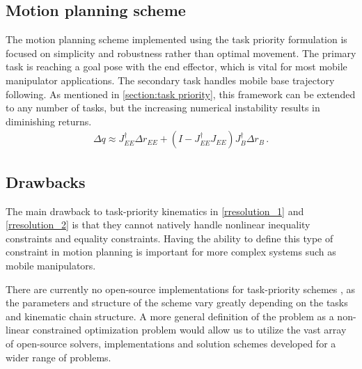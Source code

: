 \documentclass[times, utf8, diplomski, english]{fer}
\begin{document}
\subsection{Motion planning scheme}
The motion planning scheme implemented using the task priority formulation is focused on simplicity and robustness rather than optimal movement.
The primary task is reaching a goal pose with the end effector, which is vital for most mobile manipulator applications. 
The secondary task handles mobile base trajectory following.
As mentioned in \ref{section:task priority}, this framework can be extended to any number of tasks, but the increasing numerical instability results in diminishing returns.
\begin{align}
\label{rresolution_3}
\Delta q \approx J_{EE}^{\dagger}\Delta r_{EE} + \left(I - J_{EE}^{\dagger}J_{EE}\right)J_{B}^{\dagger}\Delta r_{B}\, .
\end{align}

\subsection{Drawbacks}\label{subsec:tp drawbacks}
The main drawback to task-priority kinematics in \eqref{rresolution_1} and \eqref{rresolution_2} is that they cannot natively handle nonlinear inequality constraints \citep{moe2016set} and equality constraints. 
Having the ability to define this type of constraint in motion planning is important for more complex systems such as mobile manipulators.

There are currently no open-source implementations for task-priority schemes , as the parameters and structure of the 
scheme vary greatly depending on the tasks and kinematic chain structure.
A more general definition of the problem as a non-linear constrained optimization problem would allow us to utilize the vast array of open-source solvers, implementations and solution schemes developed for a wider range of problems.
\end{document}
